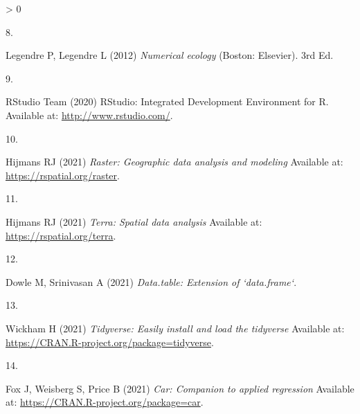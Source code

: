 \documentclass[9pt,twoside,lineno]{pnas-new}
\newlength{\csllabelwidth}
\newlength{\cslhangindent}
\newenvironment{CSLReferences}[2] %
 {%
  \setlength{\parindent}{0pt}
  \ifodd #1 \everypar{\setlength{\hangindent}{\cslhangindent}}\ignorespaces\fi
  \ifnum #2 > 0
  \setlength{\parskip}{#2\baselineskip}
  \fi
 }%
 {}
\newcommand{\CSLLeftMargin}[1]{\parbox[t]{\csllabelwidth}{#1}}
\newcommand{\CSLRightInline}[1]{\parbox[t]{\linewidth - \csllabelwidth}{#1}\break}
\begin{document}
\begin{CSLReferences}{0}{0}
\leavevmode\hypertarget{ref-Legendre2012}{}%
\CSLLeftMargin{8. }
\CSLRightInline{Legendre P, Legendre L (2012) \emph{{Numerical ecology}} (Boston: Elsevier). 3rd Ed.}

\leavevmode\hypertarget{ref-RStudio}{}%
\CSLLeftMargin{9. }
\CSLRightInline{RStudio Team (2020) {RStudio: Integrated Development Environment for R}. Available at: \url{http://www.rstudio.com/}.}

\leavevmode\hypertarget{ref-R-raster}{}%
\CSLLeftMargin{10. }
\CSLRightInline{Hijmans RJ (2021) \emph{Raster: Geographic data analysis and modeling} Available at: \url{https://rspatial.org/raster}.}

\leavevmode\hypertarget{ref-R-terra}{}%
\CSLLeftMargin{11. }
\CSLRightInline{Hijmans RJ (2021) \emph{Terra: Spatial data analysis} Available at: \url{https://rspatial.org/terra}.}

\leavevmode\hypertarget{ref-R-data.table}{}%
\CSLLeftMargin{12. }
\CSLRightInline{Dowle M, Srinivasan A (2021) \emph{Data.table: Extension of `data.frame`}.}

\leavevmode\hypertarget{ref-R-tidyverse}{}%
\CSLLeftMargin{13. }
\CSLRightInline{Wickham H (2021) \emph{Tidyverse: Easily install and load the tidyverse} Available at: \url{https://CRAN.R-project.org/package=tidyverse}.}

\leavevmode\hypertarget{ref-R-car}{}%
\CSLLeftMargin{14. }
\CSLRightInline{Fox J, Weisberg S, Price B (2021) \emph{Car: Companion to applied regression} Available at: \url{https://CRAN.R-project.org/package=car}.}

\end{CSLReferences}



% 
\end{document}
